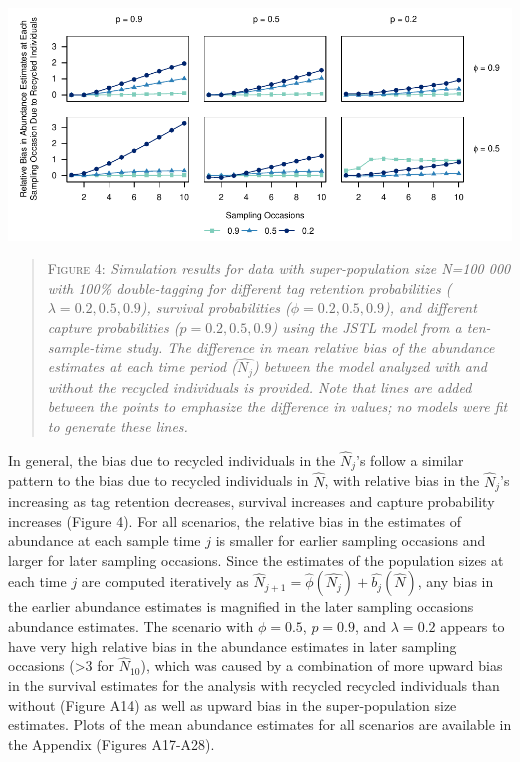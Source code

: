\documentclass[]{article}
\begin{document}
\includegraphics{RecycledPaper_files/figure-latex/Figure4_N_j-1.pdf}

\begin{quote}
\textsc{Figure 4:}
\textsl{Simulation results for data with super-population size N=100 000 with 100\% double-tagging for different tag retention probabilities ($\lambda=0.2,0.5,0.9$), survival probabilities ($\phi=0.2,0.5,0.9$), and different capture probabilities ($p=0.2,0.5,0.9$) using the JSTL model from a ten-sample-time study. The difference in mean relative bias of the abundance estimates at each time period ($\hat{N_j}$) between the model analyzed with and without the recycled individuals is provided. Note that lines are added between the points to emphasize the difference in values; no models were fit to generate these lines.}
\end{quote}

In general, the bias due to recycled individuals in the \(\hat{N}_j\)'s
follow a similar pattern to the bias due to recycled individuals in
\(\hat{N}\), with relative bias in the \(\hat{N}_j\)'s increasing as tag
retention decreases, survival increases and capture probability
increases (Figure 4). For all scenarios, the relative bias in the
estimates of abundance at each sample time \(j\) is smaller for earlier
sampling occasions and larger for later sampling occasions. Since the
estimates of the population sizes at each time \(j\) are computed
iteratively as
\(\hat{N}_{j+1}=\hat{\phi}(\hat{N_j})+\hat{b_j}(\hat{N})\), any bias in
the earlier abundance estimates is magnified in the later sampling
occasions abundance estimates. The scenario with \(\phi=0.5\),
\(p=0.9\), and \(\lambda=0.2\) appears to have very high relative bias
in the abundance estimates in later sampling occasions (\textgreater{}3
for \(\hat{N}_{10}\)), which was caused by a combination of more upward
bias in the survival estimates for the analysis with recycled recycled
individuals than without (Figure A14) as well as upward bias in the
super-population size estimates. Plots of the mean abundance estimates
for all scenarios are available in the Appendix (Figures A17-A28).
\end{document}
